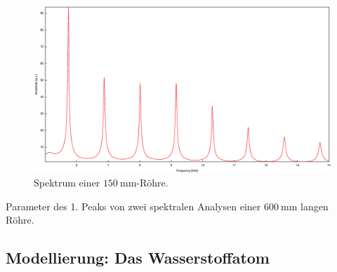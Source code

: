 \begin{figure}
\centering
\includegraphics[width=\linewidth-70pt,height=\textheight-70pt,keepaspectratio]{FP-V23data/1.2(4.1)_150mm.eps}
\caption{Spektrum einer $\SI{150}{\milli\meter}$-Röhre.}
\label{fig:150}
\end{figure}

\begin{table}
\caption{Parameter des 1. Peaks von zwei spektralen Analysen einer $\SI{600}{\milli\meter}$ langen Röhre.}
\centering

\label{tab:param}
\end{table}

\subsection{Modellierung: Das Wasserstoffatom}

